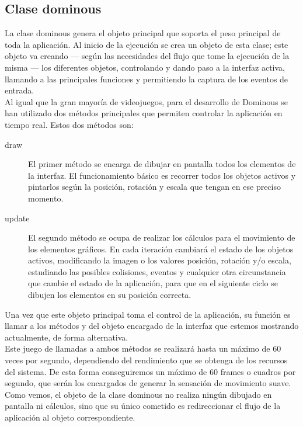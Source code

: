 \subsection{Clase dominous}

La clase dominous genera el objeto principal que soporta el peso principal de toda la aplicación. Al inicio de la
ejecución se crea un objeto de esta clase; este objeto va creando --- según las necesidades del flujo que tome
la ejecución de la misma --- los diferentes objetos, controlando y dando paso a la interfaz activa, llamando a
las principales funciones y permitiendo la captura de los eventos de entrada. \\

Al igual que la gran mayoría de videojuegos, para el desarrollo de Dominous se han utilizado dos métodos principales
que permiten controlar la aplicación en tiempo real. Estos dos métodos son:
\begin{description}
    \item[draw] El primer método se encarga de dibujar en pantalla todos los elementos de la interfaz. El funcionamiento
        básico es recorrer todos los objetos activos y pintarlos según la posición, rotación y escala que tengan en
        ese preciso momento. 
    \item[update] El segundo método se ocupa de realizar los cálculos para el movimiento de los elementos gráficos. 
        En cada iteración cambiará el estado de los objetos activos, modificando la imagen o los valores posición,
        rotación y/o escala, estudiando las posibles colisiones, eventos y cualquier otra circunstancia que cambie
        el estado de la aplicación, para que en el siguiente ciclo se dibujen los elementos en su posición correcta.
\end{description}

Una vez que este objeto principal toma el control de la aplicación, su función es llamar a los métodos 
y  del objeto encargado de la interfaz que estemos mostrando actualmente, de forma alternativa. \\

Este juego de llamadas a ambos métodos se realizará hasta un máximo de 60 veces por segundo, dependiendo del rendimiento
que se obtenga de los recursos del sistema. De esta forma conseguiremos un máximo de 60 frames o cuadros por segundo,
que serán los encargados de generar la sensación de movimiento suave. \\

Como vemos, el objeto de la clase dominous no realiza ningún dibujado en pantalla ni cálculos, sino que su único
cometido es redireccionar el flujo de la aplicación al objeto correspondiente.

